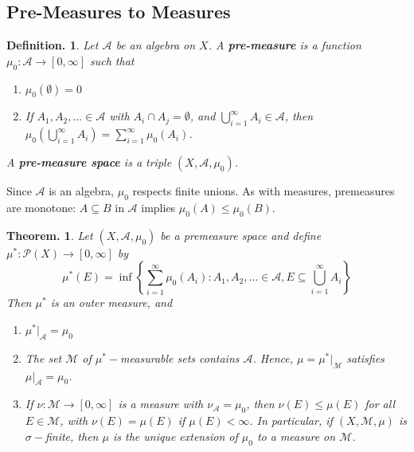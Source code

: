 \documentclass[11pt, a4paper]{memoir}
\theoremstyle{change}
\newtheorem{theorem}{Theorem.}[section]
\theoremstyle{plain}
\theoremstyle{nonumberplain}
\newtheorem{definition}{Definition.}
\numberwithin{equation}{section}
\begin{document}
\subsection{Pre-Measures to Measures}
\begin{definition}
    Let $\mathcal{A}$ be an algebra on $X$.
    A \textbf{pre-measure} is a function $\mu_0:\mathcal{A}\to[0,\infty]$ such that
    \begin{enumerate}[nl,r]
        \item $\mu_0(\emptyset)=0$
        \item If $A_1,A_2,\ldots\in\mathcal{A}$ with $A_i\cap A_j=\emptyset$, and $\bigcup_{i=1}^\infty A_i\in \mathcal{A}$, then $\mu_0(\bigcup_{i=1}^\infty A_i)=\sum_{i=1}^\infty \mu_0(A_i)$.
    \end{enumerate}
    A \textbf{pre-measure space} is a triple $(X,\mathcal{A},\mu_0)$.
\end{definition}
Since $\mathcal{A}$ is an algebra, $\mu_0$ respects finite unions.
As with measures, premeasures are monotone: $A\subseteq B$ in $\mathcal{A}$ implies $\mu_0(A)\leq\mu_0(B)$.
\begin{theorem}\label{thm:pre-to-m}
    Let $(X,\mathcal{A},\mu_0)$ be a premeasure space and define $\mu^*:\mathcal{P}(X)\to[0,\infty]$ by
    \begin{equation*}
        \mu^*(E)=\inf\left\{\sum\limits_{i=1}^\infty \mu_0(A_i):A_1,A_2,\ldots\in\mathcal{A},E\subseteq\bigcup_{i=1}^\infty A_i\right\}
    \end{equation*}
    Then $\mu^*$ is an outer measure, and
    \begin{enumerate}[nl,r]
        \item $\mu^*|_{\mathcal{A}}=\mu_0$
        \item The set $\mathcal{M}$ of $\mu^*-$measurable sets contains $\mathcal{A}$.
            Hence, $\mu=\mu^*|_{\mathcal{M}}$ satisfies $\mu|_{\mathcal{A}}=\mu_0$.
        \item If $\nu:\mathcal{M}\to[0,\infty]$ is a measure with $\nu_{\mathcal{A}}=\mu_0$, then $\nu(E)\leq\mu(E)$ for all $E\in\mathcal{M}$, with $\nu(E)=\mu(E)$ if $\mu(E)<\infty$.
            In particular, if $(X,\mathcal{M},\mu)$ is $\sigma-$finite, then $\mu$ is the unique extension of $\mu_0$ to a measure on $\mathcal{M}$.
    \end{enumerate}
\end{theorem}
\end{document}
